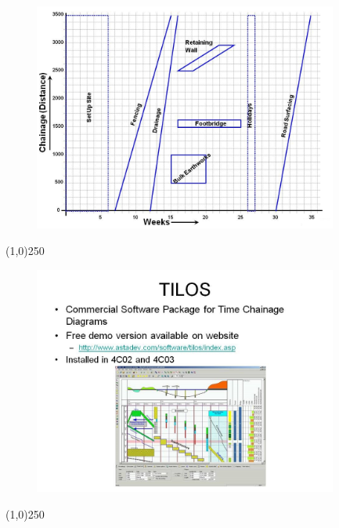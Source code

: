 \begin{frame}
\begin{figure}
	\centering
		\includegraphics[width = 10.0cm]{oldnotes/Slide313.jpg}
\end{figure}
\end{frame}
\begin{center}\line(1,0){250}\end{center}




\begin{frame}
\begin{figure}
	\centering
		\includegraphics[width = 10.0cm]{oldnotes/Slide314.jpg}
\end{figure}
\end{frame}
\begin{center}\line(1,0){250}\end{center}




